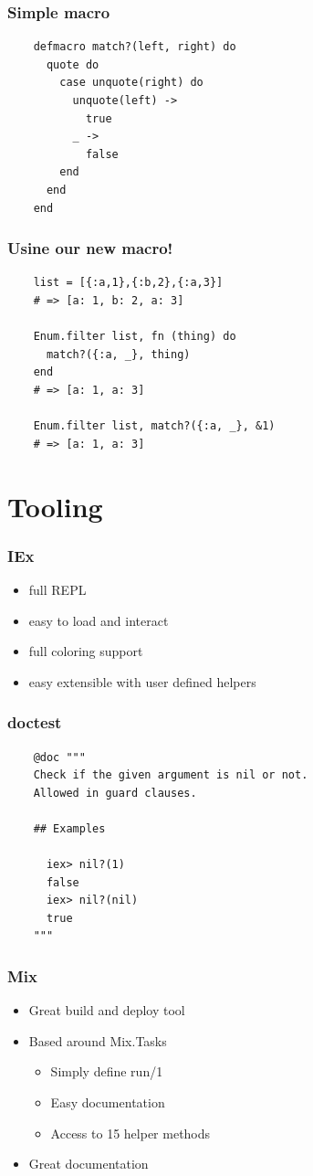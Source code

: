 \documentclass{beamer}
\begin{document}
\begin{frame}[fragile]
  \frametitle{Simple macro}
  \begin{lstlisting}
    defmacro match?(left, right) do
      quote do
        case unquote(right) do
          unquote(left) ->
            true
          _ ->
            false
        end
      end
    end
  \end{lstlisting}
\end{frame}

\begin{frame}[fragile]
  \frametitle{Usine our new macro!}
  \begin{lstlisting}
    list = [{:a,1},{:b,2},{:a,3}]
    # => [a: 1, b: 2, a: 3]

    Enum.filter list, fn (thing) do
      match?({:a, _}, thing)
    end
    # => [a: 1, a: 3]

    Enum.filter list, match?({:a, _}, &1)
    # => [a: 1, a: 3]
  \end{lstlisting}
\end{frame}

\section[Section]{Tooling}

\begin{frame}
  \frametitle{IEx}
  \begin{itemize}
  \item full REPL
  \item easy to load and interact
  \item full coloring support
  \item easy extensible with user defined helpers
  \end{itemize}
\end{frame}

\begin{frame}[fragile]
  \frametitle{doctest}
  \begin{verbatim}
    @doc """
    Check if the given argument is nil or not.
    Allowed in guard clauses.

    ## Examples

      iex> nil?(1)
      false
      iex> nil?(nil)
      true
    """
  \end{verbatim}
\end{frame}


\begin{frame}
  \frametitle{Mix}
  \begin{itemize}
  \item Great build and deploy tool
  \item Based around Mix.Tasks
    \begin{itemize}
    \item Simply define run/1
    \item Easy documentation
    \item Access to 15 helper methods
    \end{itemize}
  \item Great documentation
  \end{itemize}
\end{frame}
\end{document}
